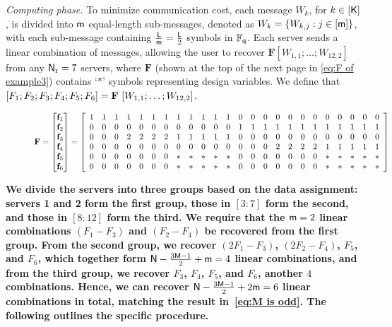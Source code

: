 \documentclass[conference,letterpaper]{IEEEtran}
\begin{document}
\begin{example}
{\it Computing phase.}
To minimize communication cost, each message $W_k$, for $k \in [{\sf K}]$, is divided into ${\sf m}$ equal-length sub-messages, denoted as $W_k = \{W_{k,j} : j \in [{\sf m}]\}$, with each sub-message containing $\frac{{\sf L}}{{\sf m}} = \frac{{\sf L}}{2}$ symbols in $\mathbb{F}_{{\sf q}}$. Each server sends a linear combination of messages, allowing the user to recover
\(\mathbf{F} [W_{1,1}; \ldots; W_{12,2}]\) from any \({\sf N}_{\rm r} = 7\) servers, where
\(\mathbf{F}\) (shown at the top of the next page in \eqref{eq:F of example3})
contains `$*$' symbols representing design variables.
We define that $[F_1;F_2;F_3;F_4;F_5;F_6]=  {\bf F} \  [W_{1,1};\ldots;W_{12,2}] $.
\begin{figure}
\begin{equation}
 {\bf F} = \begin{bmatrix}  
 {{\bf f}}_1 \\
 {{\bf f}}_2 \\
 {{\bf f}}_3 \\
 {{\bf f}}_4\\
 {{\bf f}}_5 \\
 {{\bf f}}_6
 \end{bmatrix}
 =
 \left[
\begin{array}{cccccccccccccccccccccccc}
  1 & 1    &   1 &1 & 1  &     1 &1 & 1 &  1 & 1    &   1 &1 &   0 & 0  &0 &   0 & 0  &0 &   0 & 0  &0 &   0 & 0  &0     \\
   0 & 0  &0 &   0 & 0  &0 &   0 & 0  &0 &   0 & 0  &0  &  1 & 1    &   1 &1 & 1  &     1 &1 & 1 &  1 & 1    &   1 &1 \\
  0 & 0  &0  &  2 & 2 & 2  &2  &  1 &1 & 1  &1&1 &   0 & 0  &0  &   0 & 0  &0&   0 & 0  &0&   0 & 0  &0\\
  0 & 0  &0&   0 & 0  &0&   0 & 0  &0&   0 & 0  &0 & 0 & 0  &0  &  2 & 2 & 2  &2  &  1 &1 & 1  &1&1 \\
  0  & 0   &   0&0& 0   & 0  &0 &  * &* & *  &  * &*  &  0  & 0   &   0&0& 0   & 0  &0 &  * &* & *  &  * &* \\
   0  & 0   &   0&0& 0   & 0  &0 &  * &* & *  &  * &*  &  0  & 0   &   0&0& 0   & 0  &0 &  * &* & *  &  * &* \\
\end{array} 
\right]
 \label{eq:F of example3}
\end{equation} %
\end{figure}

\textbf{We divide the servers into three groups based on the data assignment: servers 1 and 2 form the first group, those in $[3:7]$ form the second, and those in $[8:12]$ form the third. We require that the ${\sf m}=2$ linear combinations \((F_1 - F_3)\) and \((F_2 - F_4)\) be recovered from the first group. From the second group, we recover \((2F_1 - F_3)\), \((2F_2 - F_4)\), \(F_5\), and \(F_6\), which together form \({\sf N} - \frac{3{\sf M} - 1}{2} + {\sf m} = 4\) linear combinations, and from the third group, we recover \(F_3\), \(F_4\), \(F_5\), and \(F_6\), another \(4\) combinations. Hence, we can recover 
${\sf N} - \frac{3{\sf M} - 1}{2} + 2{\sf m} = 6$ linear combinations in total, matching the result in~\eqref{eq:M is odd}. The following outlines the specific procedure.}




\end{example}
\end{document}
